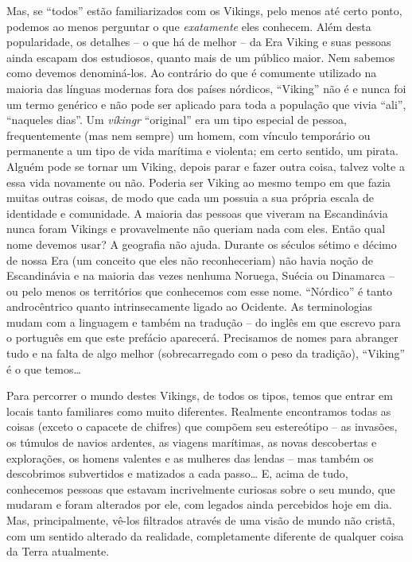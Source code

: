 Mas, se ``todos'' estão familiarizados com os Vikings, pelo menos até
certo ponto, podemos ao menos perguntar o que
\emph{exatamente} eles conhecem. Além desta popularidade, os detalhes --
o que há de melhor -- da Era Viking e suas pessoas ainda escapam dos
estudiosos, quanto mais de um público maior. Nem sabemos como devemos
denominá-los. Ao contrário do que é comumente utilizado na maioria das
línguas modernas fora dos países nórdicos, ``Viking'' não é e nunca foi
um termo genérico e não pode ser aplicado para toda a população que
vivia ``ali'', ``naqueles dias''. Um \emph{víkingr} ``original'' era um
tipo especial de pessoa, frequentemente (mas nem sempre) um homem, com
vínculo temporário ou permanente a um tipo de vida marítima e violenta;
em certo sentido, um pirata. Alguém pode se tornar um Viking, depois
parar e fazer outra coisa, talvez volte a essa vida novamente ou não.
Poderia ser Viking ao mesmo tempo em que fazia muitas outras coisas, de modo que cada um possuia a sua própria escala de identidade e comunidade. A maioria das
pessoas que viveram na Escandinávia nunca foram Vikings e provavelmente
não queriam nada com eles. Então qual nome devemos usar? A geografia não
ajuda. Durante os séculos sétimo e décimo de nossa Era (um conceito que
eles não reconheceriam) não havia noção de Escandinávia e na maioria das
vezes nenhuma Noruega, Suécia ou Dinamarca -- ou pelo menos os
territórios que conhecemos com esse nome. ``Nórdico'' é tanto
androcêntrico quanto intrinsecamente ligado ao Ocidente. As
terminologias mudam com a linguagem e também na tradução -- do inglês em
que escrevo para o português em que este prefácio aparecerá. Precisamos
de nomes para abranger tudo e na falta de algo melhor (sobrecarregado
com o peso da tradição), ``Viking'' é o que temos\ldots{}

Para percorrer o mundo destes Vikings, de todos os tipos, temos que
entrar em locais tanto familiares como muito diferentes. Realmente
encontramos todas as coisas (exceto o capacete de chifres) que compõem
seu estereótipo -- as invasões, os túmulos de navios ardentes, as
viagens marítimas, as novas descobertas e explorações, os homens
valentes e as mulheres das lendas -- mas também os descobrimos
subvertidos e matizados a cada passo\ldots{} E, acima de tudo, conhecemos
pessoas que estavam incrivelmente curiosas sobre o seu mundo, que
mudaram e foram alterados por ele, com legados ainda percebidos hoje em
dia. Mas, principalmente, vê-los filtrados através de uma visão de mundo
não cristã, com um sentido alterado da realidade, completamente
diferente de qualquer coisa da Terra atualmente.

